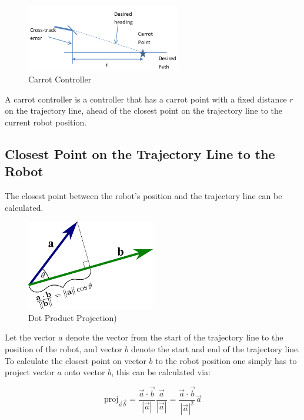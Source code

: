 \documentclass{article}
\begin{document}
\begin{figure}[H]
	\centering
	\includegraphics[width=0.6\textwidth]{images/carrot_controller.png}
	\caption{Carrot Controller}
	\label{fig:carrot_controller}
\end{figure}

A carrot controller is a controller that has a carrot point with a fixed distance $r$ on the trajectory line, ahead of the closest point on the trajectory line to the current robot position.


\subsection{Closest Point on the Trajectory Line to the Robot}
The closest point between the robot's position and the trajectory line can be calculated. 

\begin{figure}[H]
	\centering
	\includegraphics[width=0.5\textwidth]{images/dot_product_projection.png}
	\caption{Dot Product Projection)}
	\label{fig:dot_product_projection}
\end{figure}

Let the vector $a$ denote the vector from the start of the trajectory line to the position of the robot, and vector $b$ denote the start and end of the trajectory line. To calculate the closest point on vector $b$ to the robot position one simply has to project vector $a$ onto vector $b$, this can be calculated via:

\begin{equation}
	\text{proj}_{\vec{a}\vec{b}} 
		= \dfrac{\vec{a} \cdot \vec{b}}{|\vec{a}|}
			\dfrac{\vec{a}}{|\vec{a}|} 
		= \dfrac{\vec{a} \cdot \vec{b}}{|\vec{a}|^{2}}
			\vec{a}
\end{equation}
\end{document}
